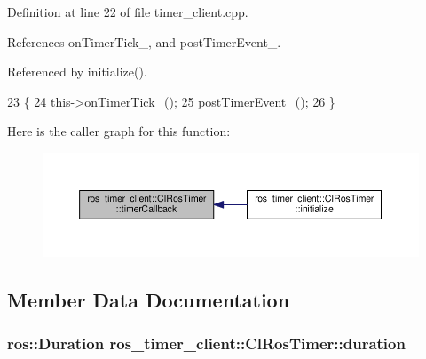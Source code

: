 Definition at line 22 of file timer\+\_\+client.\+cpp.



References on\+Timer\+Tick\+\_\+, and post\+Timer\+Event\+\_\+.



Referenced by initialize().


\begin{DoxyCode}
23 \{
24     this->\hyperlink{classros__timer__client_1_1ClRosTimer_a8c7a2ee6e8e8512b3f997e5560c0dc18}{onTimerTick\_}();
25     \hyperlink{classros__timer__client_1_1ClRosTimer_a36d871ca009545bf5f43b8b18064e075}{postTimerEvent\_}();
26 \}
\end{DoxyCode}


Here is the caller graph for this function\+:\nopagebreak
\begin{figure}[H]
\begin{center}
\leavevmode
\includegraphics[width=350pt]{classros__timer__client_1_1ClRosTimer_a185e36ae923a104618300d6b67b6864d_icgraph}
\end{center}
\end{figure}




\subsection{Member Data Documentation}
\subsubsection[{\texorpdfstring{duration}{duration}}]{\setlength{\rightskip}{0pt plus 5cm}ros\+::\+Duration ros\+\_\+timer\+\_\+client\+::\+Cl\+Ros\+Timer\+::duration\hspace{0.3cm}{\ttfamily [protected]}}\hypertarget{classros__timer__client_1_1ClRosTimer_a79df7a52481e520ba959f3e6afb0a817}{}\label{classros__timer__client_1_1ClRosTimer_a79df7a52481e520ba959f3e6afb0a817}


